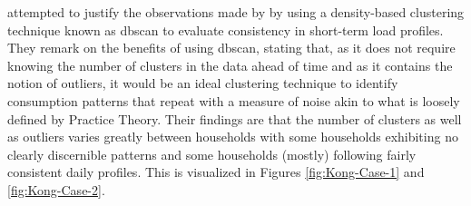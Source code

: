 

\noindent \newline \citet{Kong} attempted to justify the observations made by \citet{Stephen} by using a density-based clustering technique known as \gls{dbscan} \cite{Ester} to evaluate consistency in short-term load profiles. They remark on the benefits of using \gls{dbscan}, stating that, as it does not require knowing the number of clusters in the data ahead of time and as it contains the notion of outliers, it would be an ideal clustering technique to identify consumption patterns that repeat with a measure of noise akin to what is loosely defined by Practice Theory. Their findings are that the number of clusters as well as outliers varies greatly between households with some households exhibiting no clearly discernible patterns and some households (mostly) following fairly consistent daily profiles. This is visualized in Figures \ref{fig:Kong-Case-1} and \ref{fig:Kong-Case-2}.

